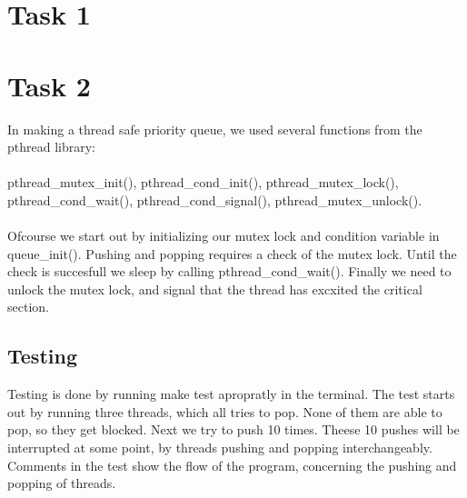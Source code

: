 \documentclass[12pt]{article}
\begin{document}
\section*{Task 1}

\section*{Task 2}
In making a thread safe priority queue, we used several functions from the pthread library:\\\\ pthread_mutex_init(), pthread_cond_init(), pthread_mutex_lock(), pthread_cond_wait(), pthread_cond_signal(), pthread_mutex_unlock().\\\\
Ofcourse we start out by initializing our mutex lock and condition variable in queue_init(). Pushing and popping requires a check of the mutex lock. Until the check is succesfull we sleep by calling pthread_cond_wait(). Finally we need to unlock the mutex lock, and signal that the thread has excxited the critical section.
\subsection*{Testing}
Testing is done by running make test apropratly in the terminal. The test starts out by running three threads, which all tries to pop. None of them are able to pop, so they get blocked. Next we try to push 10 times. Theese 10 pushes will be interrupted at some point, by threads pushing and popping interchangeably.\\ Comments in the test show the flow of the program, concerning the pushing and popping of threads.
\end{document}
